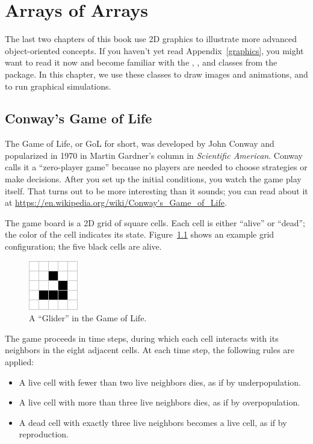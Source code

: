 \chapter{Arrays of Arrays}
\label{conway}

The last two chapters of this book use 2D graphics to illustrate more advanced object-oriented concepts.
If you haven't yet read Appendix~\ref{graphics}, you might want to read it now and become familiar with the , , and  classes from the  package.
In this chapter, we use these classes to draw images and animations, and to run graphical simulations.


\section{Conway's Game of Life}

The Game of Life, or GoL for short, was developed by John Conway and popularized in 1970 in Martin Gardner's column in {\it Scientific American}.
Conway calls it a ``zero-player game'' because no players are needed to choose strategies or make decisions.
After you set up the initial conditions, you watch the game play itself.
That turns out to be more interesting than it sounds; you can read about it at \url{https://en.wikipedia.org/wiki/Conway's_Game_of_Life}.

The game board is a 2D grid of square cells.
Each cell is either ``alive'' or ``dead''; the color of the cell indicates its state.
Figure~\ref{fig:glider} shows an example grid configuration; the five black cells are alive.

\begin{figure}[!ht]
\begin{center}
\includegraphics{figs/glider.png}
\caption{A ``Glider'' in the Game of Life.}
\label{fig:glider}
\end{center}
\end{figure}


The game proceeds in time steps, during which each cell interacts with its neighbors in the eight adjacent cells.
At each time step, the following rules are applied:

\begin{itemize}
\small
\item A live cell with fewer than two live neighbors dies, as if by underpopulation.
\item A live cell with more than three live neighbors dies, as if by overpopulation.
\item A dead cell with exactly three live neighbors becomes a live cell, as if by reproduction.
\end{itemize}

